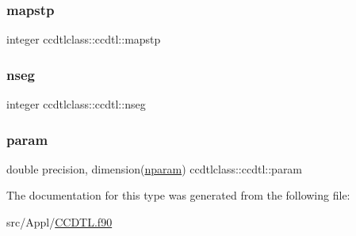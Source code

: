 \mbox{\label{structccdtlclass_1_1ccdtl_a646c337f17e8c188638d58449ea92b99}} 
\subsubsection{\texorpdfstring{mapstp}{mapstp}}
{\footnotesize\ttfamily integer ccdtlclass\+::ccdtl\+::mapstp}

\mbox{\label{structccdtlclass_1_1ccdtl_a56759205b010998a69c2716e35e0d6d6}} 
\subsubsection{\texorpdfstring{nseg}{nseg}}
{\footnotesize\ttfamily integer ccdtlclass\+::ccdtl\+::nseg}

\mbox{\label{structccdtlclass_1_1ccdtl_a6b125e6ca6440736ab2272ad373cc24d}} 
\subsubsection{\texorpdfstring{param}{param}}
{\footnotesize\ttfamily double precision, dimension(\mbox{\hyperlink{namespaceccdtlclass_a0e8e95c86f2dab6639fc79f05859b6ea}{nparam}}) ccdtlclass\+::ccdtl\+::param}



The documentation for this type was generated from the following file\+:\begin{DoxyCompactItemize}
\item 
src/\+Appl/\mbox{\hyperlink{_c_c_d_t_l_8f90}{C\+C\+D\+T\+L.\+f90}}\end{DoxyCompactItemize}
